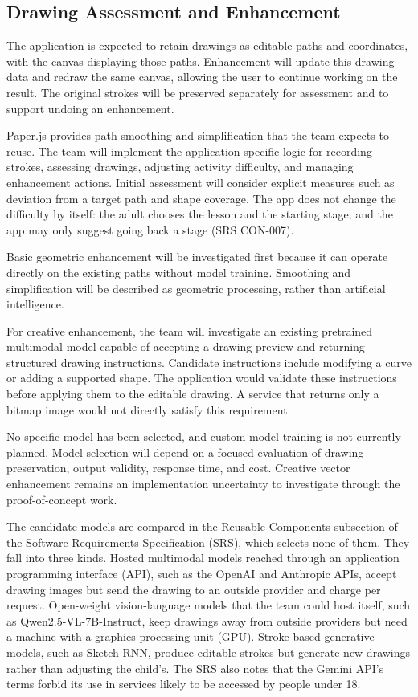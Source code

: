 \documentclass{article}
\begin{document}
\FloatBarrier
\subsection{Drawing Assessment and Enhancement}

The application is expected to retain drawings as editable paths and
coordinates, with the canvas displaying those paths. Enhancement will
update this drawing data and redraw the same canvas, allowing the user
to continue working on the result. The original strokes will be
preserved separately for assessment and to support undoing an
enhancement.

Paper.js provides path smoothing and simplification that the team
expects to reuse. The team will implement the application-specific
logic for recording strokes, assessing drawings, adjusting activity
difficulty, and managing enhancement actions. Initial assessment will
consider explicit measures such as deviation from a target path and
shape coverage. The app does not change the difficulty by itself:
the adult chooses the lesson and the starting stage, and the app may
only suggest going back a stage (SRS CON-007).

Basic geometric enhancement will be investigated first because it can
operate directly on the existing paths without model training.
Smoothing and simplification will be described as geometric processing,
rather than artificial intelligence.

For creative enhancement, the team will investigate an existing
pretrained multimodal model capable of accepting a drawing preview
and returning structured drawing instructions. Candidate instructions
include modifying a curve or adding a supported shape. The application
would validate these instructions before applying them to the editable
drawing. A service that returns only a bitmap image would not directly
satisfy this requirement.

No specific model has been selected, and custom model training is not
currently planned. Model selection will depend on a focused evaluation
of drawing preservation, output validity, response time, and cost.
Creative vector enhancement remains an implementation uncertainty
to investigate through the proof-of-concept work.

The candidate models are compared in the Reusable Components
subsection of the
\href{https://github.com/AHMEDELZARIA/squigglr/blob/main/pdfs/SRS/SRS.pdf}
{Software Requirements Specification (SRS)}, which selects none of
them. They fall into three kinds. Hosted multimodal models reached
through an application programming interface (API), such as the
OpenAI and Anthropic APIs, accept drawing images but send the drawing
to an outside provider and charge per request. Open-weight
vision-language models that the team could host itself, such as
Qwen2.5-VL-7B-Instruct, keep drawings away from outside providers but
need a machine with a graphics processing unit (GPU). Stroke-based
generative models, such as Sketch-RNN, produce editable strokes but
generate new drawings rather than adjusting the child's. The SRS also
notes that the Gemini API's terms forbid its use in services likely
to be accessed by people under 18.
\end{document}
